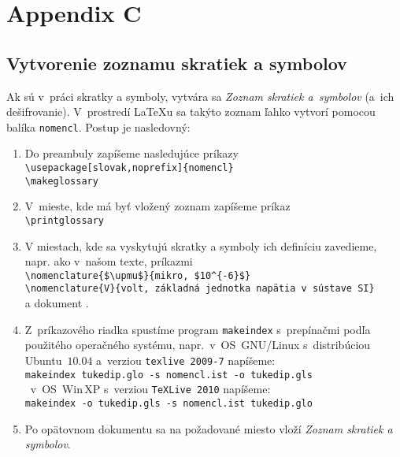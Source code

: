 \section*{Appendix C}
\subsection*{Vytvorenie zoznamu skratiek a symbolov}

Ak sú v~práci skratky a symboly, vytvára sa \emph{Zoznam skratiek
a~symbolov} (a~ich dešifrovanie). V~prostredí \LaTeX{}u sa takýto
zoznam
ľahko vytvorí pomocou balíka \verb+nomencl+. Postup je nasledovný:
\begin{enumerate}
\item Do preambuly zapíšeme nasledujúce príkazy\\
\verb+\usepackage[slovak,noprefix]{nomencl}+\\ \verb+\makeglossary+
\item  V~mieste, kde má byť\/ vložený zoznam zapíšeme príkaz\\
\verb+\printglossary+
\item V miestach, kde sa vyskytujú skratky a symboly ich definíciu
zavedieme, napr. ako     	v~našom texte, príkazmi\\
\verb+\nomenclature{$\upmu$}{mikro, $10^{-6}$}+\\
\verb+\nomenclature{V}{volt, základná jednotka napätia v sústave SI}+\\
a dokument .
\item Z~príkazového riadka spustíme program \verb+makeindex+
s~prepínačmi podľa použitého operačného systému, napr.~v~OS~GNU/Linux
s~distribúciou Ubuntu~$10.04$ a~verziou \verb+texlive 2009-7+
napíšeme:\\
\verb*+makeindex tukedip.glo -s nomencl.ist -o tukedip.gls+\\
~v~OS~Win\,XP s~verziou \verb+TeXLive 2010+
napíšeme:\\
\verb*+makeindex -o tukedip.gls -s nomencl.ist tukedip.glo+

\item Po opätovnom  dokumentu sa na
požadované
miesto vloží \emph{Zoznam skratiek a symbolov}.
\end{enumerate}
